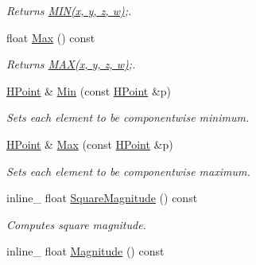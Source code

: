 \begin{DoxyCompactItemize}
\begin{DoxyCompactList}\small\item\em Returns \hyperlink{IceTypes_8h_a3acffbd305ee72dcd4593c0d8af64a4f}{M\+I\+N(x, y, z, w)};. \end{DoxyCompactList}\item 
float \hyperlink{classHPoint_ae6d05272997559325b6d77fca17949c5}{Max} () const \hypertarget{classHPoint_ae6d05272997559325b6d77fca17949c5}{}\label{classHPoint_ae6d05272997559325b6d77fca17949c5}

\begin{DoxyCompactList}\small\item\em Returns \hyperlink{IceTypes_8h_afa99ec4acc4ecb2dc3c2d05da15d0e3f}{M\+A\+X(x, y, z, w)};. \end{DoxyCompactList}\item 
\hyperlink{classHPoint}{H\+Point} \& \hyperlink{classHPoint_af2cbee07c1867886df792470100bf397}{Min} (const \hyperlink{classHPoint}{H\+Point} \&p)\hypertarget{classHPoint_af2cbee07c1867886df792470100bf397}{}\label{classHPoint_af2cbee07c1867886df792470100bf397}

\begin{DoxyCompactList}\small\item\em Sets each element to be componentwise minimum. \end{DoxyCompactList}\item 
\hyperlink{classHPoint}{H\+Point} \& \hyperlink{classHPoint_a8ce5b1d87b642e766df8848bd2ef8e5d}{Max} (const \hyperlink{classHPoint}{H\+Point} \&p)\hypertarget{classHPoint_a8ce5b1d87b642e766df8848bd2ef8e5d}{}\label{classHPoint_a8ce5b1d87b642e766df8848bd2ef8e5d}

\begin{DoxyCompactList}\small\item\em Sets each element to be componentwise maximum. \end{DoxyCompactList}\item 
inline\+\_\+ float \hyperlink{classHPoint_a9dfac3b4c726f5371a6e005d4586b6df}{Square\+Magnitude} () const \hypertarget{classHPoint_a9dfac3b4c726f5371a6e005d4586b6df}{}\label{classHPoint_a9dfac3b4c726f5371a6e005d4586b6df}

\begin{DoxyCompactList}\small\item\em Computes square magnitude. \end{DoxyCompactList}\item 
inline\+\_\+ float \hyperlink{classHPoint_afd62312596b4f75efabd6c82367b7a1e}{Magnitude} () const \hypertarget{classHPoint_afd62312596b4f75efabd6c82367b7a1e}{}\label{classHPoint_afd62312596b4f75efabd6c82367b7a1e}


\end{DoxyCompactItemize}
